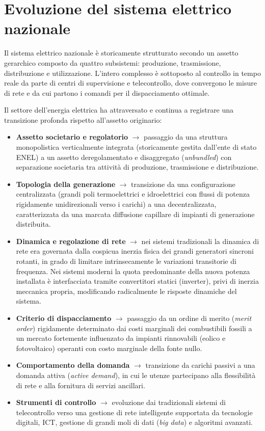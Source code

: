 \section{Evoluzione del sistema elettrico nazionale}
Il sistema elettrico nazionale è storicamente strutturato secondo un assetto gerarchico composto da quattro subsistemi: produzione, trasmissione, distribuzione e utilizzazione. L'intero complesso è sottoposto al controllo in tempo reale da parte di centri di supervisione e telecontrollo, dove convergono le misure di rete e da cui partono i comandi per il dispacciamento ottimale.

Il settore dell'energia elettrica ha attraversato e continua a registrare una transizione profonda rispetto all'assetto originario:
\begin{itemize}
    \item \textbf{Assetto societario e regolatorio} $\rightarrow$ passaggio da una struttura monopolistica verticalmente integrata (storicamente gestita dall'ente di stato ENEL) a un assetto deregolamentato e disaggregato (\textit{unbundled}) con separazione societaria tra attività di produzione, trasmissione e distribuzione.
    \item \textbf{Topologia della generazione} $\rightarrow$ transizione da una configurazione centralizzata (grandi poli termoelettrici e idroelettrici con flussi di potenza rigidamente unidirezionali verso i carichi) a una decentralizzata, caratterizzata da una marcata diffusione capillare di impianti di generazione distribuita.
    \item \textbf{Dinamica e regolazione di rete} $\rightarrow$ nei sistemi tradizionali la dinamica di rete era governata dalla cospicua inerzia fisica dei grandi generatori sincroni rotanti, in grado di limitare intrinsecamente le variazioni transitorie di frequenza. Nei sistemi moderni la quota predominante della nuova potenza installata è interfacciata tramite convertitori statici (inverter), privi di inerzia meccanica propria, modificando radicalmente le risposte dinamiche del sistema.
    \item \textbf{Criterio di dispacciamento} $\rightarrow$ passaggio da un ordine di merito (\textit{merit order}) rigidamente determinato dai costi marginali dei combustibili fossili a un mercato fortemente influenzato da impianti rinnovabili (eolico e fotovoltaico) operanti con costo marginale della fonte nullo.
    \item \textbf{Comportamento della domanda} $\rightarrow$ transizione da carichi passivi a una domanda attiva (\textit{active demand}), in cui le utenze partecipano alla flessibilità di rete e alla fornitura di servizi ancillari.
    \item \textbf{Strumenti di controllo} $\rightarrow$ evoluzione dai tradizionali sistemi di telecontrollo verso una gestione di rete intelligente supportata da tecnologie digitali, ICT, gestione di grandi moli di dati (\textit{big data}) e algoritmi avanzati.
\end{itemize}


